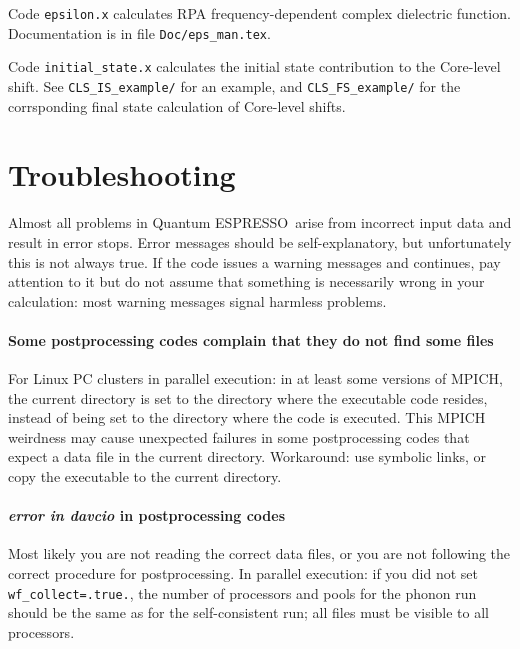 \documentclass[12pt,a4paper]{article}
\def\qe{{\sc Quantum ESPRESSO}}
\begin{document}
Code \texttt{epsilon.x} calculates RPA frequency-dependent complex dielectric 
function. Documentation is in file \texttt{Doc/eps\_man.tex}.

Code \texttt{initial\_state.x} calculates the initial state contribution
to the Core-level shift. See \texttt{CLS\_IS\_example/} for
an example, and \texttt{CLS\_FS\_example/} for the corrsponding
final state calculation of Core-level shifts.

\section{Troubleshooting}

Almost all problems in \qe\ arise from incorrect input data and result in
error stops. Error messages should be self-explanatory, but unfortunately
this is not always true. If the code issues a warning messages and continues,
pay attention to it but do not assume that something is necessarily wrong in
your calculation: most warning messages signal harmless problems.

\paragraph{Some postprocessing codes complain that they do not find some files}
For Linux PC clusters in parallel execution: in at least some versions
of MPICH, the current directory is set to the directory where the executable
code resides, instead of being set to the directory where the code is executed.
This MPICH weirdness may cause unexpected failures in some postprocessing
codes that expect a data file in the current directory. Workaround: use
symbolic links, or copy the executable to the current directory.

\paragraph{{\em error in davcio} in postprocessing codes}
Most likely you are not reading the correct data files, or you are not
following the correct procedure for postprocessing. In parallel execution: 
if you did not set \texttt{wf\_collect=.true.}, the number of processors and 
pools for the phonon run should be the same as for the
self-consistent run; all files must be visible to all processors.
\end{document}
